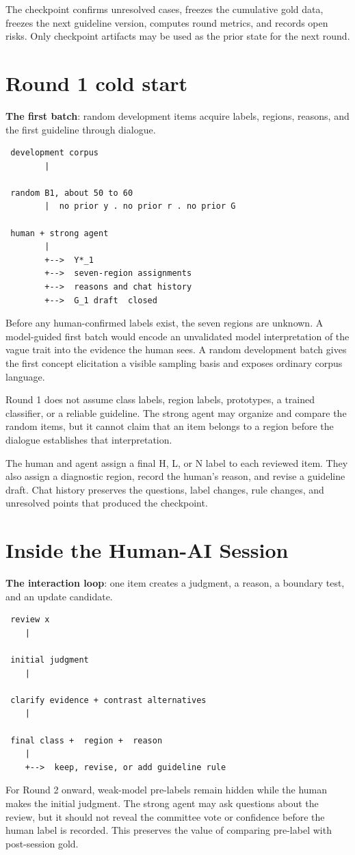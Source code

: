 The checkpoint confirms unresolved cases, freezes the cumulative gold data, freezes the next guideline version, computes round metrics, and records open risks. Only checkpoint artifacts may be used as the prior state for the next round.


\section{Round 1 cold start}
\textbf{The first batch}: random development items acquire labels, regions, reasons, and the first guideline through dialogue.

\begin{verbatim}
 development corpus
        |

 random B1, about 50 to 60
        |  no prior y . no prior r . no prior G

 human + strong agent
        |
        +-->  Y*_1
        +-->  seven-region assignments
        +-->  reasons and chat history
        +-->  G_1 draft  closed
\end{verbatim}
Before any human-confirmed labels exist, the seven regions are unknown. A model-guided first batch would encode an unvalidated model interpretation of the vague trait into the evidence the human sees. A random development batch gives the first concept elicitation a visible sampling basis and exposes ordinary corpus language.

Round 1 does not assume class labels, region labels, prototypes, a trained classifier, or a reliable guideline. The strong agent may organize and compare the random items, but it cannot claim that an item belongs to a region before the dialogue establishes that interpretation.

The human and agent assign a final H, L, or N label to each reviewed item. They also assign a diagnostic region, record the human's reason, and revise a guideline draft. Chat history preserves the questions, label changes, rule changes, and unresolved points that produced the checkpoint.


\section{Inside the Human-AI Session}
\textbf{The interaction loop}: one item creates a judgment, a reason, a boundary test, and an update candidate.

\begin{verbatim}
 review x
    |

 initial judgment
    |

 clarify evidence + contrast alternatives
    |

 final class +  region +  reason
    |
    +-->  keep, revise, or add guideline rule
\end{verbatim}
For Round 2 onward, weak-model pre-labels remain hidden while the human makes the initial judgment. The strong agent may ask questions about the review, but it should not reveal the committee vote or confidence before the human label is recorded. This preserves the value of comparing pre-label with post-session gold.

